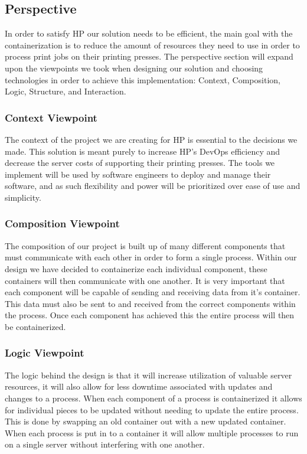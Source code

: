 \documentclass[onecolumn, draftclsnofoot,10pt, compsoc]{IEEEtran}
\begin{document}
\subsection{Perspective}
In order to satisfy HP our solution needs to be efficient, the main goal with the containerization is to reduce the amount of resources they need to use in order to process print jobs on their printing presses. The perspective section will expand upon the viewpoints we took when designing our solution and choosing technologies in order to achieve this implementation: Context, Composition, Logic, Structure, and Interaction.

\subsubsection{Context Viewpoint}
The context of the project we are creating for HP is essential to the decisions we made. This solution is meant purely to increase HP’s DevOps efficiency and decrease the server costs of supporting their printing presses. The tools we implement will be used by software engineers to deploy and manage their software, and as such flexibility and power will be prioritized over ease of use and simplicity.
\subsubsection{Composition Viewpoint}
The composition of our project is built up of many different components that must communicate with each other in order to form a single process. Within our design we have decided to containerize each individual component, these containers will then communicate with one another. It is very important that each component will be capable of sending and receiving data from it's container. This data must also be sent to and received from the correct components within the process. Once each component has achieved this the entire process will then be containerized. 
\subsubsection{Logic Viewpoint}
The logic behind the design is that it will increase utilization of valuable server resources, it will also allow for less downtime associated with updates and changes to a process. When each component of a process is containerized it allows for individual pieces to be updated without needing to update the entire process. This is done by swapping an old container out with a new updated container. When each process is put in to a container it will allow multiple processes to run on a single server without interfering with one another. 
\end{document}
